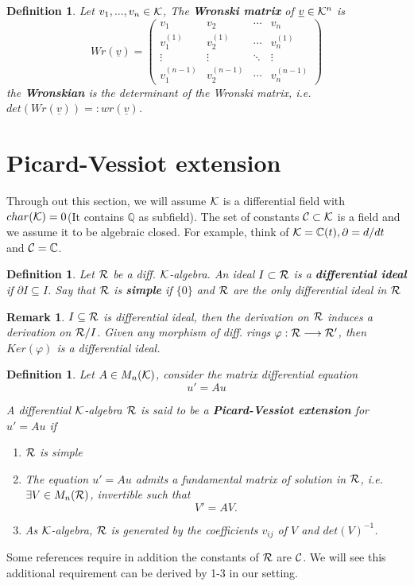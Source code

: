 \documentclass[11pt]{article}
\newtheorem{dfn}[thm]{Definition}
\newtheorem{rmk}[thm]{Remark}
\newcommand{\pd}{\partial}
\newcommand{\cplx}{\mathbb C}
\newcommand{\ratl}{\mathbb Q}
\newcommand{\calc}{{\cal C}}
\newcommand{\calk}{{\cal K}}
\newcommand{\calr}{{\cal R}}
\newcommand{\lrta}{\longrightarrow}
\begin{document}
\begin{dfn}
Let $v_1,...,v_n\in \calk$, The \textbf{Wronski matrix} of $\underline{v}\in \calk^n$
is 
$$
Wr(\underline{v})=
\begin{pmatrix}
v_1  & v_2 & \cdots & v_n\\
v_1^{(1)} & v_2^{(1)} & \cdots & v_n^{(1)}\\
\vdots  & \vdots & \ddots & \vdots \\
v_1^{(n-1)} & v_2^{(n-1)} & \cdots & v_n^{(n-1)}
\end{pmatrix}
$$
the \textbf{Wronskian} is the determinant of the Wronski matrix, i.e. $det(Wr(\underline{v}))=:wr(\underline{v})$.
\end{dfn}

\section{Picard-Vessiot extension}

Through out this section, we will assume 
$\calk$ is a differential field with $char(\calk)=0$(It contains $\ratl$ as subfield). The set of constants $\calc\subset \calk$ is a field and we assume it to be algebraic closed.  For example, think of $\calk=\cplx(t),\pd=d/dt$ and $\calc=\cplx$.

\begin{dfn}
Let $\calr$ be a diff. $\calk$-algebra. An ideal $I\subset \calr$ is a \textbf{differential ideal} if $\pd I\subseteq I$. Say that $\calr$ is \textbf{simple} if $\{0\}$ and $\calr$ are the only differential ideal in $\calr$
\end{dfn}

\begin{rmk}
$I\subseteq\calr$ is differential ideal, then the derivation on $\calr$ induces a derivation on $\calr/I$. Given any morphism of diff. rings $\varphi:\calr\lrta \calr'$, then $Ker(\varphi)$ is a differential ideal.
\end{rmk}

\begin{dfn}
Let $A\in M_n(\calk)$, consider the matrix differential equation
$$
u'=Au
$$

A differential $\calk$-algebra $\calr$ is said to be a \textbf{Picard-Vessiot extension} for  $u'=Au$ if
\begin{enumerate}
\item $\calr$ is simple 
\item The equation $u'=Au$ admits a fundamental matrix of solution in $\calr$, i.e. $\exists V\in M_n(\calr)$, invertible such that
$$
V'=AV.
$$
\item As $\calk$-algebra, $\calr$ is generated by the coefficients  $v_{ij}$ of $V$ and $det(V)^{-1}$.
\end{enumerate}
\end{dfn}
Some references require in addition the constants of $\calr$ are $\calc$. We will see this additional requirement can be derived by 1-3 in our setting.
\end{document}
